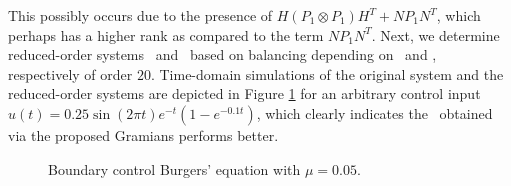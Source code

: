  This possibly occurs due to the presence of $H(P_1\otimes P_1)H^T + NP_1N^T$, which  perhaps has a higher rank as compared to the term $NP_1N^T$.   Next, we determine reduced-order systems \redQBbal ~and \redBbal ~based on balancing depending on \GramQB ~and \GramB, respectively of order $20$. Time-domain simulations of the original system and the reduced-order systems are depicted in Figure \ref{fig:1}  for an arbitrary control input $u(t) = 0.25\sin(2\pi t)e^{-t}(1-e^{-0.1t})$, which clearly indicates the \redQBbal~obtained via the proposed Gramians performs better.
\begin{figure}[h]
        \centering
 \begin{subfigure}[h]{0.49\textwidth}
  \centering
	\setlength\fheight{3cm}
	\setlength\fwidth{5.5cm}
	
 \end{subfigure}
 \begin{subfigure}[h]{0.49\textwidth}
  \centering
	\setlength\fheight{3cm}
	\setlength\fwidth{5.5cm}
	
 \end{subfigure}
 \caption{Boundary control Burgers' equation with $\mu = 0.05$.}
\label{fig:1}
\end{figure}


